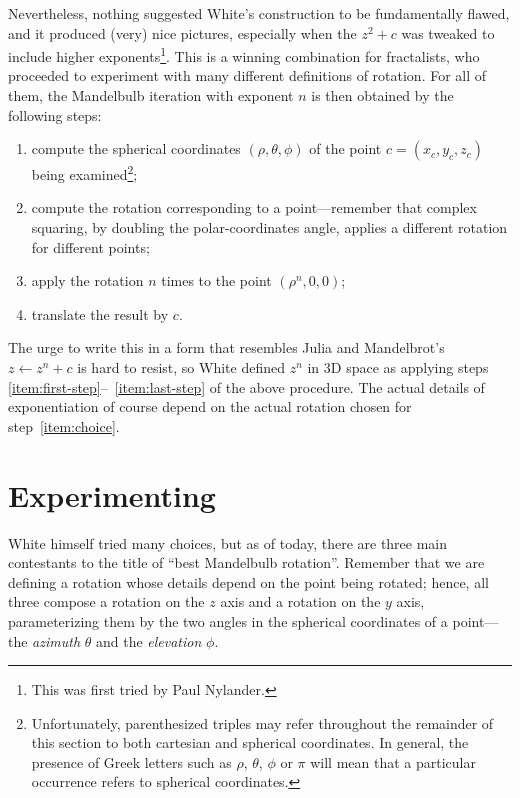 \documentclass{article}
\begin{document}
Nevertheless, nothing suggested White's construction to be
fundamentally flawed, and it produced (very) nice pictures, especially
when the $z^2+c$ was tweaked to include higher exponents\footnote{This
  was first tried by Paul Nylander.}.  This is a winning combination
for fractalists, who proceeded to experiment with many different
definitions of rotation.  For all of them, the Mandelbulb iteration with
exponent $n$ is then obtained by the following steps:
\begin{enumerate}
\item \label{item:first-step}
  compute the spherical coordinates $(\rho,\theta,\phi)$ of the
  point $c=(x_c,y_c,z_c)$ being examined\footnote{Unfortunately,
    parenthesized triples may refer throughout the remainder of this
    section to both cartesian and spherical coordinates.  In general,
    the presence of Greek letters such as $\rho$, $\theta$, $\phi$ or
    $\pi$ will mean that a particular occurrence refers to spherical
    coordinates.};

\item \label{item:choice} compute the rotation corresponding to a
  point---remember that complex squaring, by doubling the
  polar-coordinates angle, applies a different rotation for different
  points;

\item \label{item:last-step}
  apply the rotation $n$ times to the point $(\rho^n,0,0)$;
\item translate the result by $c$.
\end{enumerate}

The urge to write this in a form that resembles Julia and Mandelbrot's
$z\leftarrow z^n+c$ is hard to resist, so White defined $z^n$ in 3D space as
applying steps \ref{item:first-step}--~\ref{item:last-step} of the
above procedure.  The actual details of exponentiation of course
depend on the actual rotation chosen for step~\ref{item:choice}.

\section{Experimenting}

White himself tried many choices, but as of today, there are three
main contestants to the title of ``best Mandelbulb rotation''.
Remember that we are defining a rotation whose details depend on the
point being rotated; hence, all three compose a rotation on the $z$ axis
and a rotation on the $y$ axis, parameterizing them by the two angles in
the spherical coordinates of a point---the \emph{azimuth} $\theta$ and
the \emph{elevation} $\phi$.
\end{document}
